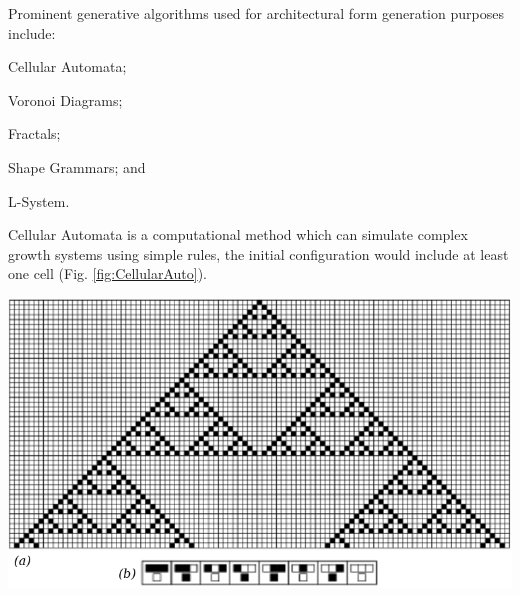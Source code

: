 \documentclass[11pt,a4paper,oneside]{article}
\newenvironment{Figure}		%
	{\par\medskip\noindent\minipage{\linewidth}}
	{\endminipage\par\medskip}
\begin{document}
\begin{multicols}{2}
Prominent generative algorithms used for architectural form generation purposes include:
\begin{compactenum}[\indent 1.]
\item Cellular Automata;
\item Voronoi Diagrams;
\item Fractals;
\item Shape Grammars; and
\item L-System.
\end{compactenum}

Cellular Automata is a computational method which can simulate complex growth systems using simple rules, the initial configuration would include at least one cell (Fig. \ref{fig:CellularAuto}).
\end{multicols}
\begin{Figure}
	\centering	
	\includegraphics[width=0.7\linewidth]{./Images/2-CellularAutomata}
	\label{fig:CellularAuto}
\end{Figure}
\end{document}
